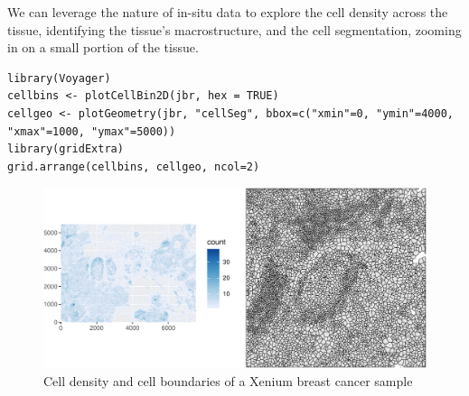 
We can leverage the nature of in-situ data to explore the cell density across the
tissue, identifying the tissue's macrostructure, and the cell segmentation,
zooming in on a small portion of the tissue.

\begin{shaded}
\begin{verbatim}
library(Voyager)
cellbins <- plotCellBin2D(jbr, hex = TRUE)
cellgeo <- plotGeometry(jbr, "cellSeg", bbox=c("xmin"=0, "ymin"=4000, "xmax"=1000, "ymax"=5000))
library(gridExtra)
grid.arrange(cellbins, cellgeo, ncol=2)
\end{verbatim}
\end{shaded}

\begin{figure}
\includegraphics[width=1\linewidth,]{spatpdfs/plotvoyager-1} \caption{Cell density and cell boundaries of a Xenium breast cancer sample}\label{fig:plotvoyager}
\end{figure}

